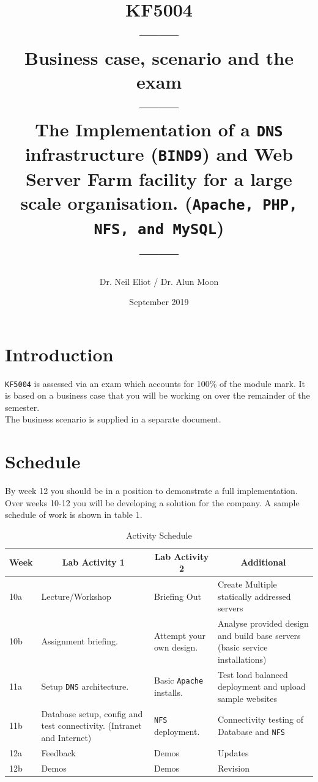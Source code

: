 \documentclass[11pt]{article}
\begin{document}
\author{Dr. Neil Eliot / Dr. Alun Moon}
\title{KF5004\\------\\Business case, scenario and the exam\\------\\The Implementation of a \texttt{DNS} infrastructure (\texttt{BIND9}) 
and Web Server Farm facility for a large scale organisation.
(\texttt{Apache, PHP, NFS, and MySQL})\\------}
\date{September 2019}
\maketitle

\newpage
\tableofcontents
\newpage

\section{Introduction}
\texttt{KF5004} is assessed via an exam which accounts for 100\% of the module mark. It is based on a business case that you will be working on 
over the remainder of the semester.\\

\noindent The business scenario is supplied in a separate document. 

\section{Schedule}
By week 12 you should be in a position to demonstrate a full implementation. Over weeks 10-12 you will be developing a solution for the company. 
A sample schedule of work is shown in table 1.

\begin{table}[ht]\label{schedule}
    \begin{tabular}{|p{1cm}|p{5cm}|p{5cm}|p{5cm}|} 
      \hline
      \multicolumn{1}{|c|}{Week} & \multicolumn{1}{|c|}{Lab Activity 1} & \multicolumn{1}{|c|}{Lab Activity 2}& \multicolumn{1}{|c|}{Additional} \\ 
      \hline
      10a & Lecture/Workshop& Briefing Out & Create Multiple statically addressed servers\\
      \hline
      10b & Assignment briefing.& Attempt your own design.& Analyse provided design and build base servers (basic service installations)\\
      \hline
      11a & Setup \texttt{DNS} architecture.& Basic \texttt{Apache} installs. & Test load balanced deployment and upload sample websites\\
      \hline
      11b & Database setup, config and test connectivity. (Intranet and Internet)& \texttt{NFS} deployment.& Connectivity testing of Database and \texttt{NFS}\\
      \hline
      12a & Feedback & Demos & Updates\\
      \hline
      12b & Demos & Demos & Revision\\
      \hline
    \end{tabular}
    \caption{Activity Schedule}
\end{table}
\newpage 
\end{document}
